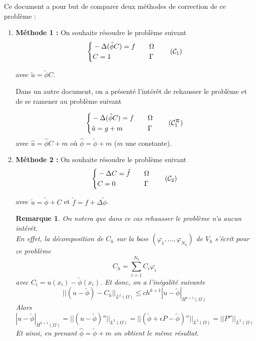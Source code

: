 \documentclass[french]{article}
\newtheorem*{Rem}{Remarque}
\begin{document}
	Ce document a pour but de comparer deux méthodes de correction de ce problème :
	\begin{enumerate}[label=\textbullet]
		\item \textbf{Méthode 1 : }
		On souhaite résoudre le problème suivant
		\begin{equation}
			\label{pbc1}
			\left\{\begin{aligned}
				&-\Delta (\tilde{\phi}C)=f \quad &&\Omega \\
				&C=1 \quad &&\Gamma
			\end{aligned}\right. \tag{$\mathcal{C}_1$}
		\end{equation}
		
		avec $\tilde{u}=\tilde{\phi}C$.
		
		Dans un autre document, on a présenté l'intérêt de rehausser le problème et de se ramener au problème suivant
		
		\begin{equation}
			\left\{\begin{aligned}
				&-\Delta (\hat{\phi}C)=f \quad &&\Omega \\
				&\hat{u}=g+m \quad &&\Gamma
			\end{aligned}\right. \label{pbc1r} \tag{$\mathcal{C}_1^\mathcal{R}$}
		\end{equation}
		avec $\hat{u}=\hat{\phi}C+m$ où $\hat{\phi}=\tilde{\phi}+m$ ($m$ une constante).
		
		
		\item \textbf{Méthode 2 : } On souhaite résoudre le problème suivant
		\begin{equation}
			\label{pbc2}
			\left\{\begin{aligned}
				&-\Delta C=\tilde{f} \quad &&\Omega \\
				&C=0 \quad &&\Gamma
			\end{aligned}\right. \tag{$\mathcal{C}_2$}
		\end{equation}
		
		avec $\tilde{u}=\tilde{\phi}+C$ et $\tilde{f}=f+\Delta\tilde{\phi}$.
		
		\begin{Rem}
			On notera que dans ce cas rehausser le problème n'a aucun intérêt. \\
			En effet, la décomposition de $C_h$ sur la base $(\varphi_1,\dots,\varphi_{N_h})$ de $V_h$ s'écrit pour ce problème			
			$$C_h=\sum_{i=1}^{N_h}C_i\varphi_i$$
			avec $C_i=u(x_i)-\tilde{\phi}(x_i)$.
			Et donc, on a l'inégalité suivante
			$$||(u-\tilde{\phi})-C_h||_{L^2(\Omega)}\le ch^{k+1}|u-\tilde{\phi}|_{H^{k+1}(\Omega)}$$
			Alors
			$$|u-\tilde{\phi}|_{H^{k+1}(\Omega)}=||(u-\tilde{\phi})''||_{L^2(\Omega)}=||(\tilde{\phi}+\epsilon P-\tilde{\phi})''||_{L^2(\Omega)}=||P''||_{L^2(\Omega)}$$
			Et ainsi, en prenant $\hat{\phi}=\tilde{\phi}+m$ on obtient le même résultat.
		\end{Rem}
	\end{enumerate}
\end{document}
